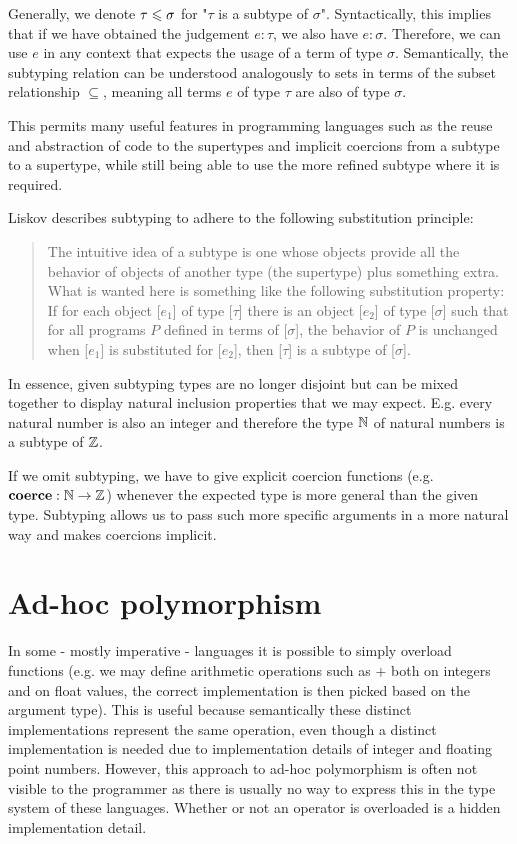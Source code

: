Generally, we denote $\tau \leqslant \sigma$ for "$\tau$ is a subtype of $\sigma$".
Syntactically, this implies that if we have obtained the judgement $e : \tau$, we also have $e : \sigma$.
Therefore, we can use $e$ in any context that expects the usage of a term of type $\sigma$.
Semantically, the subtyping relation can be understood analogously to sets in terms of the subset relationship $\subseteq$,
meaning all terms $e$ of type $\tau$ are also of type $\sigma$.
\cite{reynolds_1998}

This permits many useful features in programming languages such as the reuse and abstraction of code to the supertypes and implicit coercions from a subtype to a supertype, while still being able to use the more refined subtype where it is required.

Liskov \cite{liskov} describes subtyping to adhere to the following substitution principle:

\begin{quote}
  The intuitive idea of a subtype is one whose objects provide all the behavior of objects of another type (the supertype) plus something extra.
  What is wanted here is something like the following substitution property:
  If for each object [$e_1$] of type [$\tau$] there is an object [$e_2$] of type [$\sigma$] such that for all programs $P$ defined in terms of [$\sigma$],
  the behavior of $P$ is unchanged when [$e_1$] is substituted for [$e_2$], then [$\tau$] is a subtype of [$\sigma$].
\end{quote}

In essence, given subtyping types are no longer disjoint but can be mixed together to display natural inclusion properties that we may expect.
E.g. every natural number is also an integer and therefore the type $\mathbb{N}$ of natural numbers is a subtype of $\mathbb{Z}$.

If we omit subtyping, we have to give explicit coercion functions (e.g. $\mathbf{coerce} : \mathbb{N} \to \mathbb{Z}$) whenever the expected type is more general than the given type.
Subtyping allows us to pass such more specific arguments in a more natural way and makes coercions implicit.

\section{Ad-hoc polymorphism}
\label{sec:ad-hoc-polymorphism}

In some - mostly imperative - languages it is possible to simply overload functions (e.g. we may define arithmetic operations such as $+$ both on integers and on float values, the correct implementation is then picked based on the argument type).
This is useful because semantically these distinct implementations represent the same operation, even though a distinct implementation is needed due to implementation details of integer and floating point numbers.
However, this approach to ad-hoc polymorphism is often not visible to the programmer as there is usually no way to express this in the type system of these languages.
Whether or not an operator is overloaded is a hidden implementation detail. %

